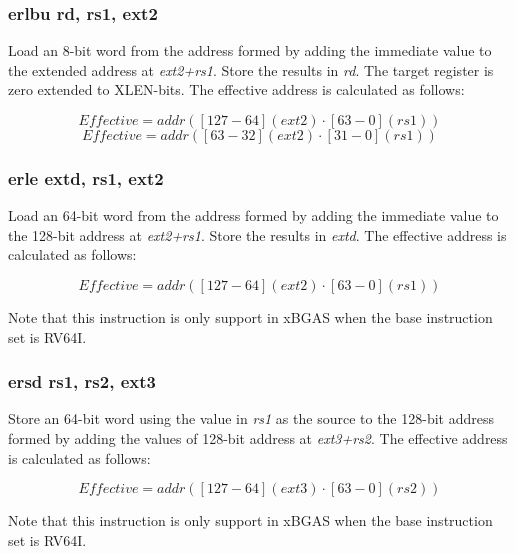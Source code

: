 \documentclass{article}
\begin{document}
\subsubsection{erlbu rd, rs1, ext2}

Load an 8-bit word from the address formed by adding the immediate value to the 
extended address at \textit{ext2+rs1}.  Store the results in \textit{rd}.  
 The target register is zero extended to XLEN-bits.  The effective 
address is calculated as follows: 

\begin{equation}
Effective = addr([127-64](ext2) \cdot [63-0](rs1))
\end{equation}
\begin{equation}
Effective = addr([63-32](ext2) \cdot [31-0](rs1))
\end{equation}

\subsubsection{erle extd, rs1, ext2}

Load an 64-bit word from the address formed by adding the immediate value to the 
128-bit address at \textit{ext2+rs1}.  Store the results in \textit{extd}.  
The effective address is calculated as follows:

\begin{equation}
Effective = addr([127-64](ext2) \cdot [63-0](rs1))
\end{equation}

\begin{commentary}
Note that this instruction is only support in xBGAS when the base 
instruction set is RV64I.
\end{commentary}

\subsubsection{ersd rs1, rs2, ext3}

Store an 64-bit word using the value in \textit{rs1} as the source 
to the 128-bit address formed by adding the values of
128-bit address at \textit{ext3+rs2}.  The effective address is calculated 
as follows: 

\begin{equation}
Effective = addr([127-64](ext3) \cdot [63-0](rs2))
\end{equation}

\begin{commentary}
Note that this instruction is only support in xBGAS when the base 
instruction set is RV64I.
\end{commentary}
\end{document}
